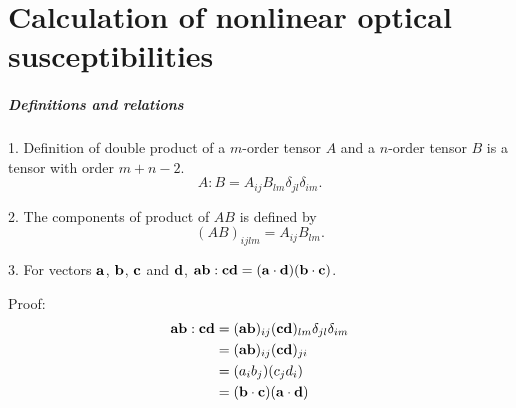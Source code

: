\chapter{Calculation of nonlinear optical susceptibilities}\label{calculation_of_chi}

\paragraph{Definitions and relations}
1. Definition of double product of a $m$-order tensor $A$ and a $n$-order tensor $B$ is a tensor with order $m+n-2$.
\begin{equation}
    A:B=A_{ij}B_{lm}\delta_{jl}\delta_{im}.
\label{tensor_double_product}
\end{equation}

2. The components of product of $AB$ is defined by 
\begin{equation}
    (AB)_{ijlm}=A_{ij}B_{lm}.
\label{tensor_product}
\end{equation}

3. For vectors $\bf{a}$, $\bf{b}$, $\bf{c}$ and $\bf{d}$, ${\bf{ab}}:{\bf{cd}}=({\bf{a}}\cdot {\bf{d}})({\bf{b}}\cdot{\bf{c}})$.

Proof:
\begin{align}
    {\bf{ab}}:{\bf{cd}}&=({\bf{ab}})_{ij}({\bf{cd}})_{lm}\delta_{jl}\delta_{im} \nonumber \\
    &=({\bf{ab}})_{ij}({\bf{cd}})_{ji} \nonumber\\
    &=(a_i b_j)(c_j d_i) \nonumber\\
    &=({\bf{b}}\cdot{\bf{c}})({\bf{a}}\cdot{\bf{d}})
\end{align}

